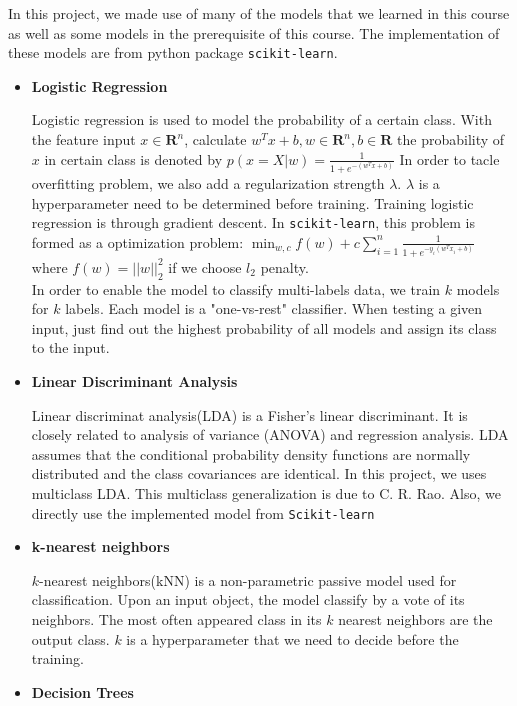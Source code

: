 \documentclass[11.5pt]{article}
\begin{document}
\begin{enumerate}
        In this project, we made use of many of the models that we learned in this course as well as some models in the prerequisite of this course. The implementation of these models are from python package \texttt{scikit-learn}\cite{scikit-learn}. 
            \begin{itemize}
                \item \textbf{Logistic Regression}
                
                Logistic regression is used to model the probability of a certain class. With the feature input $x \in \mathbf{R}^n$, calculate $w^Tx + b, w \in \mathbf{R}^n, b \in \mathbf{R}$ the probability of $x$ in certain class is denoted by 
                $p(x = X | w) = \frac{1}{1 + e^{-(w^Tx + b)}}$
                In order to tacle overfitting problem, we also add a regularization strength $\lambda$. $\lambda$ is a hyperparameter need to be determined before training. Training logistic regression is through gradient descent. In \texttt{scikit-learn}\cite{scikit-learn}, this problem is formed as a optimization problem: 
                $\min_{w, c} f(w) + c\sum_{i=1}^{n}\frac{1}{1 + e^{-y_i(w^Tx_i + b)}} $ 
                where $f(w) = ||w||^2_2$ if we choose $l_2$ penalty.\\ 
                In order to enable the model to classify multi-labels data, we train $k$ models for $k$ labels. Each model is a "one-vs-rest" classifier. When testing a given input, just find out the highest probability of all models and assign its class to the input.
                \item \textbf{Linear Discriminant Analysis}
                
                Linear discriminat analysis(LDA) is a Fisher's linear discriminant\cite{fisherDA}. It is closely related to analysis of variance (ANOVA) and regression analysis. LDA assumes that the conditional probability density functions are normally distributed and the class covariances are identical.           In this project, we uses multiclass LDA. This multiclass generalization is due to C. R. Rao\cite{multiLDA}. Also, we directly use the implemented model from \texttt{Scikit-learn}\cite{scikit-learn}

                \item \textbf{k-nearest neighbors}
                
                $k$-nearest neighbors(kNN) is a non-parametric passive model used for classification. Upon an input object, the model classify by a vote of its neighbors. The most often appeared class in its $k$ nearest neighbors are the output class. $k$ is a hyperparameter that we need to decide before the training.
                \item \textbf{Decision Trees}
                

\end{itemize}
\end{enumerate}
\end{document}
